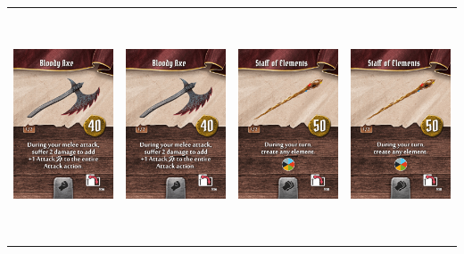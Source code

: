 \documentclass{minimal}
\begin{document}
{\begin{longtable}{llll}
\includegraphics[width=44mm,height=68mm]{./64-151/gh-117-bloody-axe.png} &
\includegraphics[width=44mm,height=68mm]{./64-151/gh-117-bloody-axe.png} &
\includegraphics[width=44mm,height=68mm]{./64-151/gh-118-staff-of-elements.png} &
\includegraphics[width=44mm,height=68mm]{./64-151/gh-118-staff-of-elements.png}\\ 

\end{longtable}}
\end{document}
